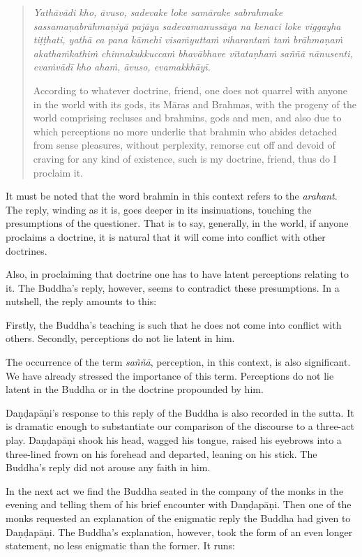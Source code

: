 \begin{quote}
\emph{Yathāvādi kho, āvuso, sadevake loke samārake sabrahmake sassamaṇabrāhmaṇiyā pajāya sadevamanussāya na kenaci loke viggayha tiṭṭhati, yathā ca pana kāmehi visaṁyuttaṁ viharantaṁ taṁ brāhmaṇaṁ akathaṁkathiṁ chinnakukkuccaṁ bhavābhave vītataṇhaṁ saññā nānusenti, evaṁvādī kho ahaṁ, āvuso, evamakkhāyī.}

According to whatever doctrine, friend, one does not quarrel with anyone in the world with its gods, its Māras and Brahmas, with the progeny of the world comprising recluses and brahmins, gods and men, and also due to which perceptions no more underlie that brahmin who abides detached from sense pleasures, without perplexity, remorse cut off and devoid of craving for any kind of existence, such is my doctrine, friend, thus do I proclaim it.
\end{quote}

It must be noted that the word brahmin in this context refers to the \emph{arahant}. The reply, winding as it is, goes deeper in its insinuations, touching the presumptions of the questioner. That is to say, generally, in the world, if anyone proclaims a doctrine, it is natural that it will come into conflict with other doctrines.

Also, in proclaiming that doctrine one has to have latent perceptions relating to it. The Buddha's reply, however, seems to contradict these presumptions. In a nutshell, the reply amounts to this:

Firstly, the Buddha's teaching is such that he does not come into conflict with others. Secondly, perceptions do not lie latent in him.

The occurrence of the term \emph{saññā}, perception, in this context, is also significant. We have already stressed the importance of this term. Perceptions do not lie latent in the Buddha or in the doctrine propounded by him.

Daṇḍapāṇi's response to this reply of the Buddha is also recorded in the sutta. It is dramatic enough to substantiate our comparison of the discourse to a three-act play. Daṇḍapāṇi shook his head, wagged his tongue, raised his eyebrows into a three-lined frown on his forehead and departed, leaning on his stick. The Buddha's reply did not arouse any faith in him.

In the next act we find the Buddha seated in the company of the monks in the evening and telling them of his brief encounter with Daṇḍapāṇi. Then one of the monks requested an explanation of the enigmatic reply the Buddha had given to Daṇḍapāṇi. The Buddha's explanation, however, took the form of an even longer statement, no less enigmatic than the former. It runs:

